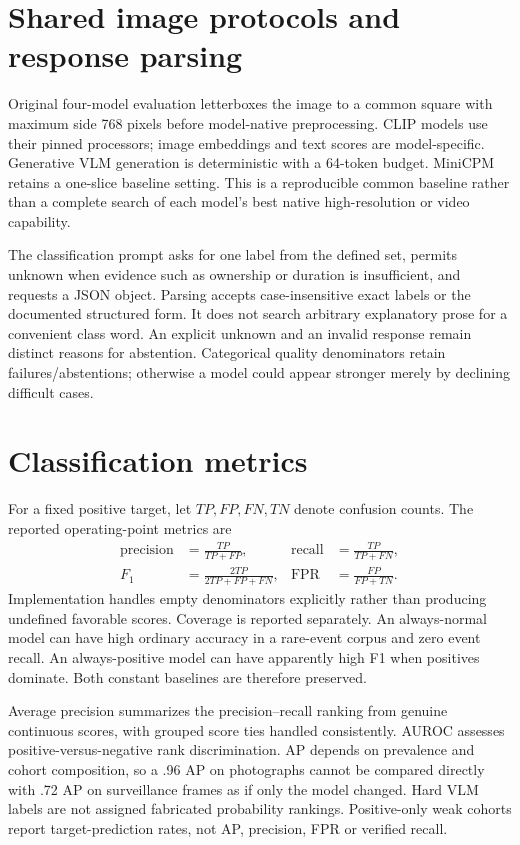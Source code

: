 \section{Shared image protocols and response parsing}
Original four-model evaluation letterboxes the image to a common square with maximum side 768 pixels before model-native preprocessing. CLIP models use their pinned processors; image embeddings and text scores are model-specific. Generative VLM generation is deterministic with a 64-token budget. MiniCPM retains a one-slice baseline setting. This is a reproducible common baseline rather than a complete search of each model's best native high-resolution or video capability.

The classification prompt asks for one label from the defined set, permits unknown when evidence such as ownership or duration is insufficient, and requests a JSON object. Parsing accepts case-insensitive exact labels or the documented structured form. It does not search arbitrary explanatory prose for a convenient class word. An explicit unknown and an invalid response remain distinct reasons for abstention. Categorical quality denominators retain failures/abstentions; otherwise a model could appear stronger merely by declining difficult cases.

\section{Classification metrics}
For a fixed positive target, let $TP,FP,FN,TN$ denote confusion counts. The reported operating-point metrics are
\begin{align}
\operatorname{precision}&=\frac{TP}{TP+FP}, &
\operatorname{recall}&=\frac{TP}{TP+FN},\\
F_1&=\frac{2TP}{2TP+FP+FN}, &
\operatorname{FPR}&=\frac{FP}{FP+TN}.
\end{align}
Implementation handles empty denominators explicitly rather than producing undefined favorable scores. Coverage is reported separately. An always-normal model can have high ordinary accuracy in a rare-event corpus and zero event recall. An always-positive model can have apparently high F1 when positives dominate. Both constant baselines are therefore preserved.

Average precision summarizes the precision--recall ranking from genuine continuous scores, with grouped score ties handled consistently. AUROC assesses positive-versus-negative rank discrimination. AP depends on prevalence and cohort composition, so a .96 AP on photographs cannot be compared directly with .72 AP on surveillance frames as if only the model changed. Hard VLM labels are not assigned fabricated probability rankings. Positive-only weak cohorts report target-prediction rates, not AP, precision, FPR or verified recall.

